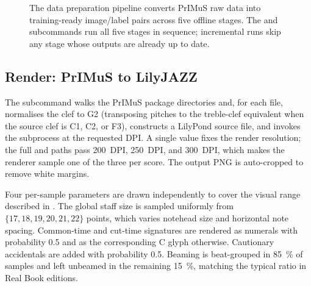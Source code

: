 \begin{figure}[ht]
\caption[Data preparation pipeline.]{The data preparation pipeline converts
  PrIMuS raw data into training-ready image/label pairs across five offline stages.
  The  and  subcommands run all five
  stages in sequence; incremental runs skip any stage whose outputs are already
  up to date.}
\label{fig:data-pipeline-impl}
\end{figure}

\subsection{Render: PrIMuS to LilyJAZZ}

The  subcommand walks the PrIMuS package directories and,
for each  file, normalises the clef to G2 (transposing
pitches to the treble-clef equivalent when the source clef is C1, C2,
or F3), constructs a LilyPond source file, and invokes the
 subprocess at the requested DPI. A single value fixes
the render resolution; the full  and 
paths pass \SI{200}{DPI}, \SI{250}{DPI}, and \SI{300}{DPI}, which makes
the renderer sample one of the three per score.
The output PNG is auto-cropped to remove white margins.

Four per-sample parameters are drawn independently to cover the visual
range described in .
The global staff size is sampled uniformly from
$\{17, 18, 19, 20, 21, 22\}$ points, which varies notehead size and
horizontal note spacing.
Common-time and cut-time signatures are rendered as numerals with
probability \num{0.5} and as the corresponding C glyph otherwise.
Cautionary accidentals are added with probability \num{0.5}.
Beaming is beat-grouped in \SI{85}{\percent} of samples and left
unbeamed in the remaining \SI{15}{\percent}, matching the typical ratio
in Real Book editions.

